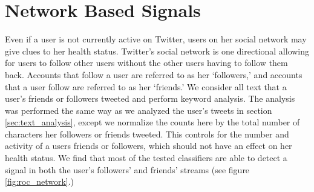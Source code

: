 \documentclass{acm_proc_article-sp}
\begin{document}
\section{Network Based Signals}

Even if a user is not currently active on Twitter, users on her social network may give clues to her health status. Twitter's social network is one directional allowing for users to follow other users without the other users having to follow them back. Accounts that follow a user are referred to as her `followers,' and accounts that a user follow are referred to as her `friends.' We consider all text that a user's friends or followers tweeted and perform keyword analysis. The analysis was performed the same way as we analyzed the user's tweets in section \ref{sec:text_analysis}, except we normalize the counts here by the total number of characters her followers or friends tweeted. This controls for the number and activity of a users friends or followers, which should not have an effect on her health status. We find that most of the tested classifiers are able to detect a signal in both the user's followers' and friends' streams (see figure \ref{fig:roc_network}.)
\end{document}
